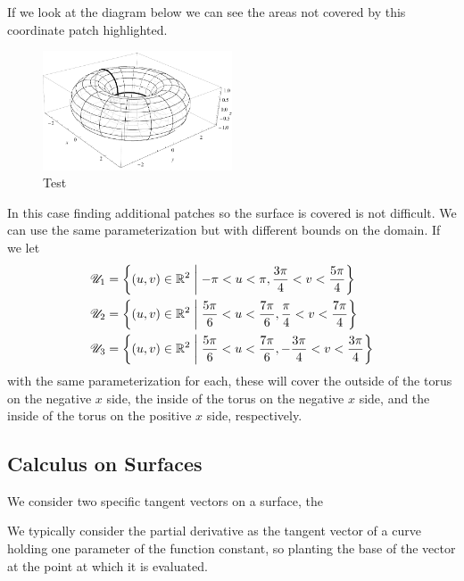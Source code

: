 If we look at the diagram below we can see the areas not covered by this coordinate patch highlighted.
\begin{figure}[t] %
  \centering
  \includegraphics[width=0.5\textwidth]{figures/torus.pdf}
  \caption{Test}
\end{figure}
In this case finding additional patches so the surface is covered is not difficult. We can use the same parameterization but with different bounds on the domain. If we let
\begin{align*}
  \mathscr{U}_1 &= \left\{(u, v) \in \mathbb{R}^2\;\middle\vert\;-\pi < u < \pi, \frac{3\pi}{4} < v < \frac{5\pi}{4}\right\}\\
  \mathscr{U}_2 &= \left\{(u, v) \in \mathbb{R}^2\;\middle\vert\;\frac{5\pi}{6} < u < \frac{7\pi}{6}, \frac{\pi}{4} < v < \frac{7\pi}{4}\right\}\\
  \mathscr{U}_3 &= \left\{(u, v) \in \mathbb{R}^2\;\middle\vert\;\frac{5\pi}{6} < u < \frac{7\pi}{6}, -\frac{3\pi}{4} < v < \frac{3\pi}{4}\right\}
\end{align*}
with the same parameterization for each, these will cover the outside of the torus on the negative $x$ side, the inside of the torus on the negative $x$ side, and the inside of the torus on the positive $x$ side, respectively.


\subsection{Calculus on Surfaces}

\begin{defn}
  We consider two specific tangent vectors on a surface, the 
\end{defn}

\begin{unno_rem}
  We typically consider the partial derivative as the tangent vector of a curve holding one parameter of the function constant, so planting the base of the vector at the point at which it is evaluated.
\end{unno_rem}


